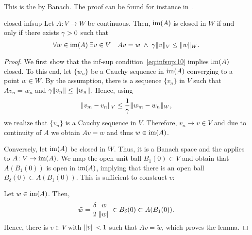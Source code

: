 \begin{remark}
  This is the \emph{} by Banach. The
  proof can be found for instance in~\cite[p.75--76]{Yosida80}.
\end{remark}

\begin{Lemma}{closed-infsup}
  Let $A\colon V\to W$ be continuous. Then, $\operatorname{im}(A)$ is closed in
  $W$ if and only if there exists $\gamma>0$ such that
  \begin{gather}
    \label{eq:infsup:10}
    \forall w\in \operatorname{im}(A)\;
    \exists v\in V\quad
    Av = w
    \;\wedge\;
    \gamma \lVert v\rVert_V \le \lVert w\rVert_W.
  \end{gather}
\end{Lemma}

\begin{proof}
  We first show that the inf-sup condition~\eqref{eq:infsup:10}
  implies $\operatorname{im}(A)$ closed. To this end, let $\{w_n\}$ be a Cauchy
  sequence in $\operatorname{im}(A)$ converging to a point $w\in W$. By the assumption,
  there
  is a sequence $\{v_n\}$ in $V$ such that $Av_n = w_n$ and
  $\gamma \lVert v_n\rVert \le \lVert w_n\rVert$. Hence, using
  \begin{gather}
    \lVert v_m-v_n\rVert_V \le \frac1{\gamma} \lVert w_m-w_n\rVert_W,
  \end{gather}
  we realize that $\{v_n\}$ is a Cauchy sequence in $V$. Therefore, $v_n\to v\in
  V$ and due to continuity of $A$ we obtain $Av=w$ and thus $w\in
  \operatorname{im}(A)$.

  Conversely, let $\operatorname{im}(A)$ be closed in $W$. Thus, it is a Banach
  space and the  applies to $A\colon
  V\to\operatorname{im}(A)$. We map the open unit ball $B_1(0)\subset V$ and
  obtain that $A(B_1(0))$ is open in $\operatorname{im}(A)$, implying that there
  is an open ball $B_\delta(0) \subset A(B_1(0))$. This is sufficient
  to construct $v$:

  Let $w\in\operatorname{im}(A)$. Then,
  \begin{gather}
    \tilde w = \frac\delta2 \frac{w}{\lVert w\rVert}
    \in B_\delta(0) \subset A(B_1(0)).
  \end{gather}
  Hence, there is $v\in V$ with $\lVert v\rVert<1$ such that $Av=\tilde w$,
  which proves the lemma.
\end{proof}

